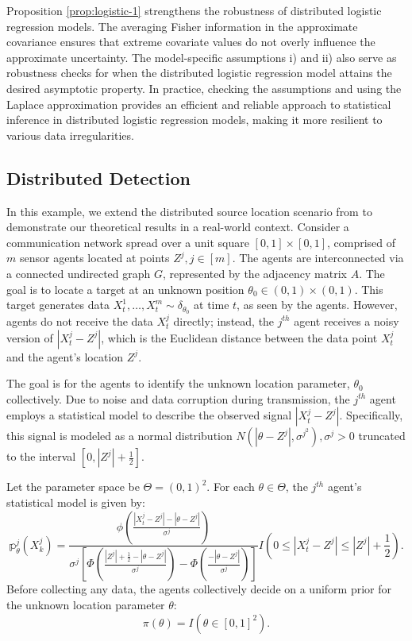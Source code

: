 \documentclass[twoside,11pt]{article}
\numberwithin{equation}{section}
\newcommand\bp{\mathbb{p}}
\begin{document}
{Proposition \ref{prop:logistic-1} strengthens the robustness of distributed logistic regression models. The averaging Fisher information in the approximate covariance ensures that extreme covariate values do not overly influence the approximate uncertainty. The model-specific assumptions i) and ii) also serve as robustness checks for when the distributed logistic regression model attains the desired asymptotic property. In practice, checking the assumptions and using the Laplace approximation provides an efficient and reliable approach to statistical inference in distributed logistic regression models, making it more resilient to various data irregularities.


\subsection{Distributed Detection}
In this example, we extend the distributed source location scenario from \cite{Nedic2017} to demonstrate our theoretical results in a real-world context. Consider a communication network spread over a unit square $[0,1] \times [0,1]$, comprised of $m$ sensor agents located at points $Z^j, j \in [m]$. The agents are interconnected via a connected undirected graph $G$, represented by the adjacency matrix $A$. The goal is to locate a target at an unknown position $\theta_0 \in (0,1) \times (0,1)$. This target generates data $X_t^1, \ldots, X_t^m \sim \delta_{\theta_0}$ at time $t$, as seen by the agents. However, agents do not receive the data $X_t^j$ directly; instead, the $j^{th}$ agent receives a noisy version of $|X_t^j - Z^j|$, which is the Euclidean distance between the data point $X_t^j$ and the agent's location $Z^j$.

The goal is for the agents to identify the unknown location parameter, $\theta_0$ collectively. Due to noise and data corruption during transmission, the $j^{th}$ agent employs a statistical model to describe the observed signal $|X_t^j - Z^j|$. Specifically, this signal is modeled as a  normal distribution $N(|\theta - Z^j|, \sigma^{j^2}),\sigma^j > 0$ truncated to the interval $[0, |Z^j| + \frac{1}{2}]$. 

Let the parameter space be $\Theta = (0,1)^2$. For each $\theta \in \Theta$, the $j^{th}$ agent's statistical model is given by:
\begin{equation} \label{eqn-detection-1}
\bp_\theta^j(X_k^j) = \frac{\phi\left(\frac{|X_t^j - Z^j| - |\theta - Z^j|}{\sigma^j}\right)}{\sigma^j \left[\Phi\left(\frac{|Z^j| + \frac{1}{2} - |\theta - Z^j|}{\sigma^j}\right) - \Phi\left(\frac{- |\theta - Z^j|}{\sigma^j}\right)\right]}  I\left(0 \leq |X_t^j - Z^j| \leq |Z^j| + \frac{1}{2}\right).
\end{equation}
Before collecting any data, the agents collectively decide on a uniform prior for the unknown location parameter $\theta$: 
\begin{equation}\label{eqn-detection-2}
\pi(\theta) = I(\theta \in [0,1]^2).
\end{equation}

}
\end{document}
